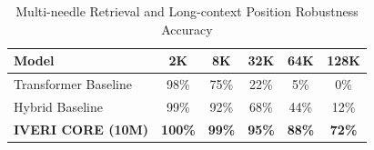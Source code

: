 \begin{table}[h]
\centering
\begin{tabular}{lccccc}
\hline
\textbf{Model} & \textbf{2K} & \textbf{8K} & \textbf{32K} & \textbf{64K} & \textbf{128K} \\ \hline
Transformer Baseline & 98\% & 75\% & 22\% & 5\% & 0\% \\
Hybrid Baseline & 99\% & 92\% & 68\% & 44\% & 12\% \\
\textbf{IVERI CORE (10M)} & \textbf{100\%} & \textbf{99\%} & \textbf{95\%} & \textbf{88\%} & \textbf{72\%} \\ \hline
\end{tabular}
\caption{Multi-needle Retrieval and Long-context Position Robustness Accuracy}
\label{tab:long_context}
\end{table}
